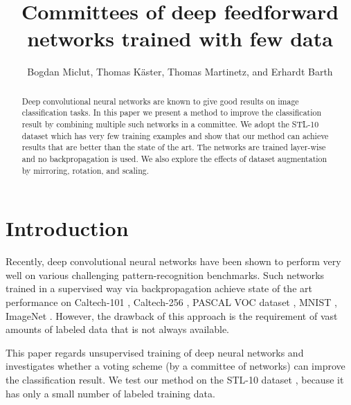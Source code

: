 \documentclass[runningheads]{llncs}
\begin{document}
\pagestyle{headings}
\mainmatter



\title{Committees of deep feedforward networks trained with few data}



\author{Bogdan Miclut, Thomas K\"aster, Thomas Martinetz, and Erhardt Barth
} 


\maketitle

\begin{abstract}
Deep convolutional neural networks are known to give good results on image classification tasks. In this paper we present a method to improve the classification result by combining multiple such networks in a committee. We adopt the STL-10 dataset which has very few training examples and show that our method can achieve results that are better than the state of the art. The networks are trained layer-wise and no backpropagation is used. We also explore the effects of dataset augmentation by mirroring, rotation, and scaling.
\end{abstract}



\section{Introduction}

Recently, deep convolutional neural networks have been shown to perform very well on various challenging pattern-recognition benchmarks. Such networks trained in a supervised way via backpropagation achieve state of the art performance on Caltech-101 \cite{CalTech101}, Caltech-256 \cite{CalTech101}, PASCAL VOC dataset \cite{Everingham10}, MNIST \cite{lecun-98}, ImageNet \cite{imagenet_cvpr09}. However, the drawback of this approach is the requirement of vast amounts of labeled data that is not always available. 

This paper regards unsupervised training of deep neural networks and investigates whether a voting scheme (by a committee of networks) can improve the classification result. We test our method on the STL-10 dataset \cite{Coates_ananalysis}, because it has only a small number of labeled training data. 
\end{document}

